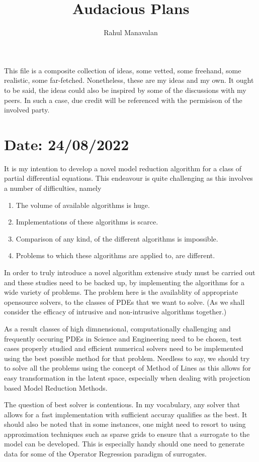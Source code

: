 \documentclass{article}
\title{Audacious Plans}
\author{Rahul Manavalan}
\date{}
\begin{document}
\maketitle

This file is a composite collection of ideas, some vetted, some freehand, some realistic, some far-fetched. 
Nonetheless, these are my ideas and my own.
It ought to be said, the ideas could also be inspired by some of the discussions with my peers.
In such a case, due credit will be referenced with the permisison of the involved party.


\section{Date: 24/08/2022}
It is my intention to develop a novel model reduction algorithm for a class of partial differential equations.
This endeavour is quite challenging as this involves a number of difficulties, namely
\begin{enumerate}
    \item The volume of available algorithms is huge.
    \item Implementations of these algorithms is scarce.
    \item Comparison of any kind, of the different algorithms is impossible.
    \item Problems to which these algorithms are applied to, are different.
\end{enumerate}

In order to truly introduce a novel algorithm extensive study must be carried out and these studies need to be backed up,
by implementing the algorithms for a wide variety of problems. The problem here is the availablity of appropriate opensource solvers,
to the classes of PDEs that we want to solve. (As we shall consider the efficacy of intrusive and non-intrusive algorithms together.)

As a result classes of high dimnensional, computationally challenging and frequently occuring PDEs in Science and Engineering need to be chosen,
test cases properly studied and efficient numerical solvers need to be implemented using the best possible method for that problem. Needless to say,
we should try to solve all the problems using the concept of Method of Lines as this allows for easy transformation in the latent space, especially when dealing with
projection based Model Reduction Methods. 

The question of best solver is contentious. In my vocabulary, any solver that allows for a fast implementation with sufficient accuray qualifies as the best.
It should also be noted that in some instances, one might need to resort to using approximation techniques such as sparse grids to ensure that a surrogate to the model can be developed.
This is especially handy should one need to generate data for some of the Operator Regression paradigm of surrogates.
\end{document}
